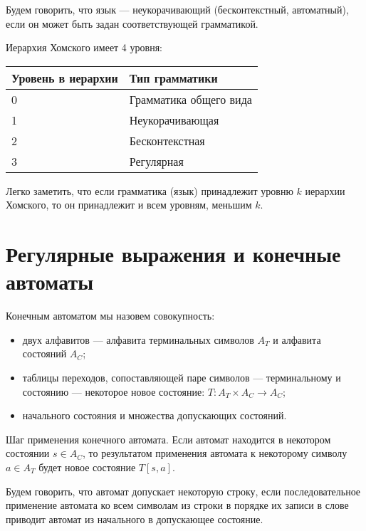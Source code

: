 \documentclass[12pt,a4paper,oneside]{article}
\begin{document}
\begin{definition}
Будем говорить, что язык --- неукорачивающий (бесконтекстный, автоматный), если
он может быть задан соответствующей грамматикой. 
\end{definition}

\begin{definition}Иерархия Хомского имеет 4 уровня:

\vspace{0.3cm}

\begin{tabular}{ll}
Уровень в иерархии&Тип грамматики\\
\hline
0 & Грамматика общего вида\\
1 & Неукорачивающая\\
2 & Бесконтекстная\\
3 & Регулярная
\end{tabular}
\end{definition}

Легко заметить, что если грамматика (язык) принадлежит уровню $k$ иерархии Хомского, 
то он принадлежит и всем уровням, меньшим $k$.

\section{Регулярные выражения и конечные автоматы}

\begin{definition}
Конечным автоматом мы назовем совокупность:
\begin{itemize}
\item двух алфавитов --- алфавита терминальных символов $A_T$ и алфавита состояний $A_C$;
\item таблицы переходов, сопоставляющей паре символов --- терминальному и состоянию --- некоторое
новое состояние: $T: A_T\times A_C \rightarrow A_C$;
\item начального состояния и множества допускающих состояний.
\end{itemize}
\end{definition}

\begin{definition}
Шаг применения конечного автомата. Если автомат находится в некотором состоянии
$s \in A_C$, то результатом применения автомата к некоторому символу $a \in A_T$
будет новое состояние $T[s,a]$.
\end{definition}

\begin{definition}
Будем говорить, что автомат допускает некоторую строку, если последовательное применение
автомата ко всем символам из строки в порядке их записи в слове приводит автомат
из начального в допускающее состояние.
\end{definition}
\end{document}
